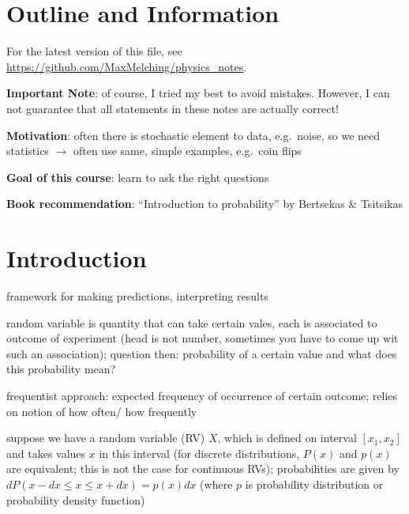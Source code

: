 \section*{Outline and Information}

\begin{center}
For the latest version of this file, see \url{https://github.com/MaxMelching/physics_notes}.

\textbf{Important Note}: of course, I tried my best to avoid mistakes. However, I can not guarantee that all statements in these notes are actually correct!


\textbf{Motivation}: often there is stochastic element to data, e.g.~noise, so we need statistics $\rightarrow$ often use same, simple examples, e.g.~coin flips


\textbf{Goal of this course}: learn to ask the right questions

\textbf{Book recommendation}: \enquote{Introduction to probability} by Bertsekas \& Tsitsikas
\end{center}



\newpage



{
\hypersetup{linkcolor=black}
\tableofcontents
}



\newpage


\pagestyle{scrheadings}



\iffalse
\section{Introduction}

framework for making predictions, interpreting results


random variable is quantity that can take certain vales, each is associated to outcome of experiment (head is not number, sometimes you have to come up wit such an association); question then: probability of a certain value and what does this probability mean?

frequentist approach: expected frequency of occurrence of certain outcome; relies on notion of how often/ how frequently


suppose we have a random variable (RV) $X$, which is defined on interval $[x_1, x_2]$ and takes values $x$ in this interval (for discrete distributions, $P(x)$ and $p(x)$ are equivalent; this is not the case for continuous RVs); probabilities are given by $dP(x - dx \leq x \leq x + dx) = p(x) dx$ (where $p$ is probability distribution or probability density function)

